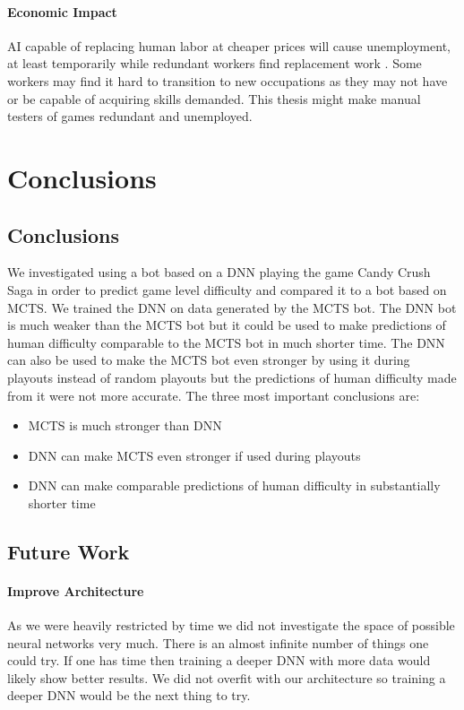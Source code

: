 \documentclass{kththesis}
\begin{document}
\subsubsection{Economic Impact}
AI capable of replacing human labor  at cheaper prices will cause unemployment, at least temporarily while redundant workers  find replacement work \cite{nilsson1984artificial}. Some workers may find it hard to transition to new occupations as they may not have or be capable of acquiring skills demanded. This thesis might make  manual testers of games redundant and unemployed.

\chapter{Conclusions}
\section{Conclusions}

We investigated using a bot based on a DNN playing the game Candy Crush Saga in order to predict game level difficulty and compared it to a bot based on MCTS. We trained the DNN on data generated by the MCTS bot. The DNN bot is much weaker than the MCTS bot but it could be used to make predictions of human difficulty comparable to the MCTS bot in much shorter time. The DNN can also be used to make the MCTS bot even stronger by using it during playouts instead of random playouts but the predictions of human difficulty made from it were not more accurate. The three most important conclusions are:
\begin{itemize}
\item  MCTS is much stronger than DNN
\item  DNN can make MCTS even stronger if used during playouts
\item DNN can make comparable predictions of human difficulty in substantially shorter time
\end{itemize}


\section{Future Work}
\subsubsection{Improve Architecture}
As we were heavily restricted by time  we did not investigate the space of possible neural networks very much. There is an almost infinite number of things one could try. If one has time then training a deeper DNN with more data would likely show better results. We did not overfit with our architecture so training a deeper DNN would be the next thing to try.
\end{document}
